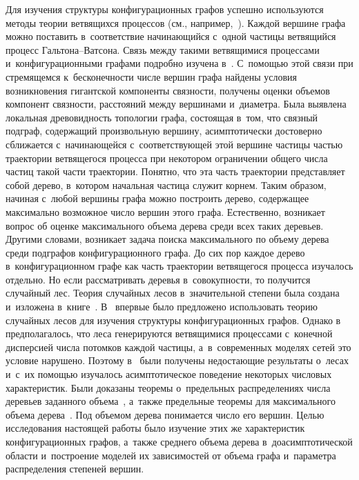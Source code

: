 \begin{multicols}{2}
Для изучения структуры конфигурационных графов успешно используются методы 
теории вет\-вя\-щих\-ся процессов (см., например,~\cite{Hof1, Hof2}). Каждой вершине 
графа можно поставить в~соответствие начинающийся с~одной час\-ти\-цы вет\-вя\-щий\-ся 
процесс Гальтона--Ватсона. Связь между такими вет\-вя\-щи\-ми\-ся процессами и~конфигурационными графами подробно изучена в~\cite{Hof2}. С~по\-мощью этой связи 
при стремящемся к~бесконечности числе вершин графа найдены условия возникновения 
гигантской компоненты связности, получены оценки объемов компонент связности, 
расстояний между вершинами и~диаметра. Была выявлена локальная древовидность 
топологии графа, состоящая в~том, что связный подграф, содержащий произвольную 
вершину, асимптотически достоверно сближается с~начинающейся с~соответствующей 
этой вершине частицы частью траектории ветвящегося процесса при некотором 
ограничении общего числа час\-тиц такой час\-ти траектории. Понятно, что эта часть 
траектории представляет собой дерево, в~котором начальная частица служит корнем. 
Таким образом, начиная с~любой вершины графа можно построить дерево, содержащее 
максимально возможное число вершин этого графа. Естественно, возникает вопрос об 
оценке максимального объема дерева среди всех таких деревьев. Другими словами, 
возникает задача поиска максимального по объему дерева среди подграфов 
конфигурационного графа.
До сих пор каждое дерево в~конфигурационном графе как часть траектории 
вет\-вя\-ще\-го\-ся процесса изуча\-лось отдельно. Но если рассматривать деревья 
в~совокупности, то получится случайный лес. Тео\-рия случайных лесов в~значительной 
степени была создана и~изложена в~книге~\cite{Pav2}. В~\cite{Pav,PavCh} впервые 
было предложено использовать тео\-рию случайных лесов для изучения структуры 
конфигурационных графов. Однако в~\cite{Pav2} предполагалось, что леса 
генерируются вет\-вя\-щи\-ми\-ся процессами с~конечной дисперсией чис\-ла потомков каждой 
частицы, а~в~современных моделях сетей это условие нарушено. Поэтому 
в~\cite{Pav,PavCh} были получены не\-до\-ста\-ющие результаты о~лесах и~с~их по\-мощью 
изучалось асимп\-то\-ти\-че\-ское поведение некоторых чис\-ло\-вых характеристик. Были 
доказаны теоремы о~предельных распределениях чис\-ла деревьев заданного 
объема~\cite{PavCh}, а~также предельные тео\-ре\-мы для максимального объема 
дерева~\cite{Pav}. Под объемом дерева понимается чис\-ло его вершин.
Целью исследования на\-сто\-ящей работы было изучение этих же характеристик 
конфигурационных графов, а~так\-же среднего объема дерева в~доасимптотической 
об\-ласти и~по\-стро\-ение моделей их зависимостей от объема графа и~па\-ра\-мет\-ра 
распределения степеней вершин.


\end{multicols}

